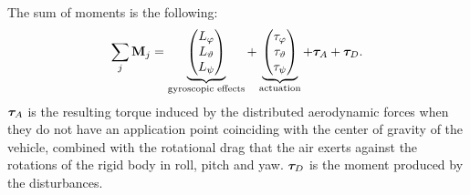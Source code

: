 \documentclass[10pt, a4paper]{report}
\begin{document}
The sum of moments is the following:\begin{equation}
    \sum_j \mathbf M_j=\underbrace{\begin{pmatrix}
        L_\varphi\\L_\vartheta\\L_\psi
    \end{pmatrix}}_{\text{gyroscopic effects}}+
     \underbrace{\begin{pmatrix}
     \tau_\varphi\\\tau_\vartheta\\\tau_\psi
     \end{pmatrix}}_{\text{actuation}} +{\boldsymbol{\tau}}_A+{\boldsymbol{\tau}}_D.
\end{equation}
${\boldsymbol{\tau}}_A$ is the resulting torque induced by the distributed aerodynamic forces when they do not have an application point coinciding with the center of gravity of the vehicle, combined with the rotational drag that the air exerts against the rotations of the rigid body in roll, pitch and yaw. ${\boldsymbol{\tau}}_D$ is the moment produced by the disturbances.
\end{document}
